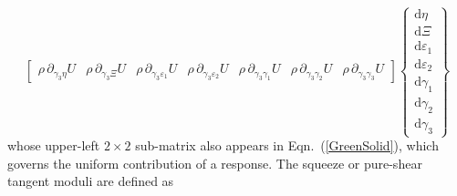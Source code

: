 \begin{equation}
\begin{bmatrix}
\rho \, \partial_{\gamma_3\eta} U & 
\rho \, \partial_{\gamma_3\Xi} U & 
\rho \, \partial_{\gamma_3\varepsilon_1} U & 
\rho \, \partial_{\gamma_3\varepsilon_2} U &
\rho \, \partial_{\gamma_3\gamma_1} U  &
\rho \, \partial_{\gamma_3\gamma_2} U &
\rho \, \partial_{\gamma_3\gamma_3} U
\end{bmatrix}
\left\{ \begin{matrix}
\mathrm{d}\eta \\ \mathrm{d} \Xi \\
\mathrm{d} \varepsilon_1 \\ \mathrm{d} \varepsilon_2 \\
\mathrm{d} \gamma_1 \\ \mathrm{d} \gamma_2 \\ \mathrm{d} \gamma_3
\end{matrix} \right\}
\label{energies3D}
\end{equation}
whose upper-left $2\times 2$ sub-matrix also appears in Eqn.~(\ref{GreenSolid}), which governs the uniform contribution of a response.  The squeeze or pure-shear tangent moduli are defined as
